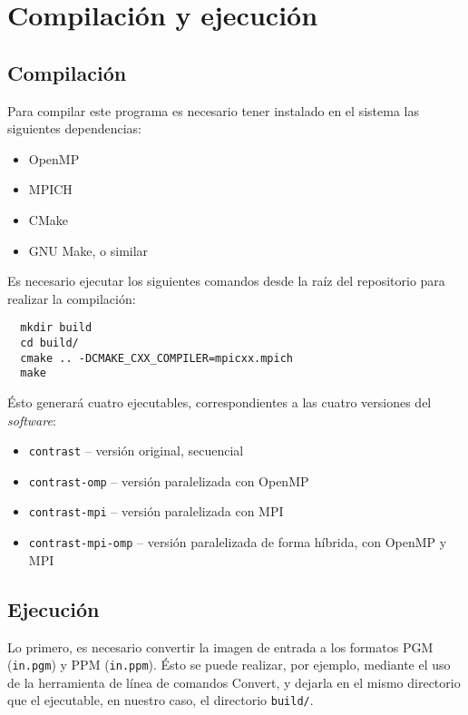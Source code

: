 \section{Compilación y ejecución}


\subsection*{Compilación}
Para compilar este programa es necesario tener instalado en el sistema las siguientes dependencias:
\begin{itemize}
  \item OpenMP
  \item MPICH
  \item CMake
  \item GNU Make, o similar
\end{itemize}


\noindent
Es necesario ejecutar los siguientes comandos desde la raíz del repositorio para realizar la compilación:
\begin{verbatim}
  mkdir build
  cd build/
  cmake .. -DCMAKE_CXX_COMPILER=mpicxx.mpich
  make
\end{verbatim}

\noindent
Ésto generará cuatro ejecutables, correspondientes a las cuatro versiones del \textit{software}:
\begin{itemize}
  \item \texttt{contrast} -- versión original, secuencial
  \item \texttt{contrast-omp} -- versión paralelizada con OpenMP
  \item \texttt{contrast-mpi} -- versión paralelizada con MPI
  \item \texttt{contrast-mpi-omp} -- versión paralelizada de forma híbrida, con OpenMP y MPI
\end{itemize}



\subsection*{Ejecución}

Lo primero, es necesario convertir la imagen de entrada a los formatos PGM (\texttt{in.pgm}) y PPM (\texttt{in.ppm}). Ésto se puede realizar, por ejemplo, mediante el uso de la herramienta de línea de comandos Convert, y dejarla en el mismo directorio que el ejecutable, en nuestro caso, el directorio \texttt{build/}.

